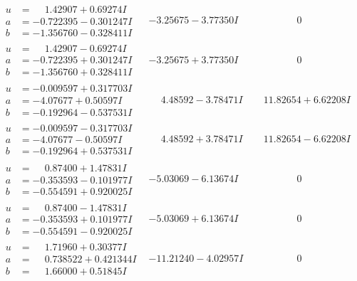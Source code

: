\documentclass[1p]{elsarticle_modified}
\theoremstyle{definition}
\begin{document}
$$\begin{array}{c|c|c}
\begin{aligned}
u &= \phantom{-}1.42907 + 0.69274 I \\
a &= -0.722395 - 0.301247 I \\
b &= -1.356760 - 0.328411 I\end{aligned}
 & -3.25675 - 3.77350 I & \phantom{-0.000000 } 0 \\ \hline\begin{aligned}
u &= \phantom{-}1.42907 - 0.69274 I \\
a &= -0.722395 + 0.301247 I \\
b &= -1.356760 + 0.328411 I\end{aligned}
 & -3.25675 + 3.77350 I & \phantom{-0.000000 } 0 \\ \hline\begin{aligned}
u &= -0.009597 + 0.317703 I \\
a &= -4.07677 + 0.50597 I \\
b &= -0.192964 - 0.537531 I\end{aligned}
 & \phantom{-}4.48592 - 3.78471 I & \phantom{-}11.82654 + 6.62208 I \\ \hline\begin{aligned}
u &= -0.009597 - 0.317703 I \\
a &= -4.07677 - 0.50597 I \\
b &= -0.192964 + 0.537531 I\end{aligned}
 & \phantom{-}4.48592 + 3.78471 I & \phantom{-}11.82654 - 6.62208 I \\ \hline\begin{aligned}
u &= \phantom{-}0.87400 + 1.47831 I \\
a &= -0.353593 - 0.101977 I \\
b &= -0.554591 + 0.920025 I\end{aligned}
 & -5.03069 - 6.13674 I & \phantom{-0.000000 } 0 \\ \hline\begin{aligned}
u &= \phantom{-}0.87400 - 1.47831 I \\
a &= -0.353593 + 0.101977 I \\
b &= -0.554591 - 0.920025 I\end{aligned}
 & -5.03069 + 6.13674 I & \phantom{-0.000000 } 0 \\ \hline\begin{aligned}
u &= \phantom{-}1.71960 + 0.30377 I \\
a &= \phantom{-}0.738522 + 0.421344 I \\
b &= \phantom{-}1.66000 + 0.51845 I\end{aligned}
 & -11.21240 - 4.02957 I & \phantom{-0.000000 } 0 \\ \hline\begin{aligned}

\end{aligned}
\end{array}$$
\end{document}
